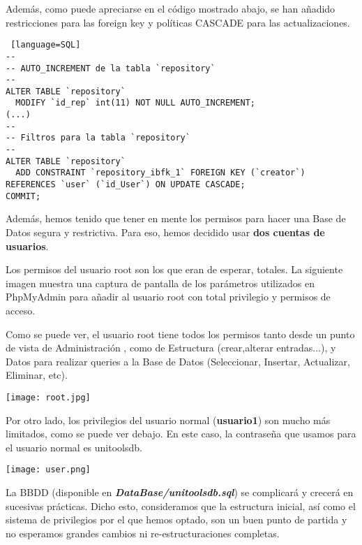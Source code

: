 \documentclass[12pt]{report}
\begin{document}
Además, como puede apreciarse en el código mostrado abajo, se han añadido restricciones para las foreign key y políticas CASCADE para las actualizaciones.
\newline

\begin{lstlisting} [language=SQL]
--
-- AUTO_INCREMENT de la tabla `repository`
--
ALTER TABLE `repository`
  MODIFY `id_rep` int(11) NOT NULL AUTO_INCREMENT;
(...)
--
-- Filtros para la tabla `repository`
--
ALTER TABLE `repository`
  ADD CONSTRAINT `repository_ibfk_1` FOREIGN KEY (`creator`) REFERENCES `user` (`id_User`) ON UPDATE CASCADE;
COMMIT;
\end{lstlisting}

Además, hemos tenido que tener en mente los permisos para hacer una Base de Datos segura y restrictiva. Para eso, hemos decidido usar \textbf{dos cuentas de usuarios}.

Los permisos del usuario root son los que eran de esperar, totales. La siguiente imagen muestra una captura de pantalla de los parámetros utilizados en PhpMyAdmin para añadir al usuario root con total privilegio y permisos de acceso.

Como se puede ver, el usuario root tiene todos los permisos tanto desde un punto de vista de Administración , como de Estructura (crear,alterar entradas...), y Datos para realizar queries a la Base de Datos (Seleccionar, Insertar, Actualizar, Eliminar, etc).


\texttt{[image: root.jpg]}

Por otro lado, los privilegios del usuario normal (\textbf{usuario1}) son mucho más limitados, como se puede ver debajo. En este caso, la contraseña que usamos para el usuario normal es unitoolsdb.

\texttt{[image: user.png]}

La BBDD (disponible en \textbf{\textit{DataBase/unitoolsdb.sql}}) se complicará y crecerá en sucesivas prácticas. Dicho esto, consideramos que la estructura inicial, así como el sistema de privilegios por el que hemos optado, son un buen punto de partida y no esperamos grandes cambios ni re-estructuraciones completas.
\end{document}

